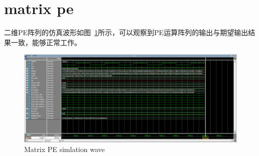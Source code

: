 \documentclass[lang=cn,11pt,a4paper]{elegantpaper}
\begin{document}
\pagebreak
\section{matrix pe}

二维PE阵列的仿真波形如图~\ref{fig:matrix-result}所示，可以观察到PE运算阵列的输出与期望输出结果一致，能够正常工作。

\begin{figure}[!htbp]
  \centering
  \includegraphics[width=1.0\textwidth]{image/matrix.png}
  \caption{Matrix PE simlation wave}
  \label{fig:matrix-result}
\end{figure}


% 
\end{document}
